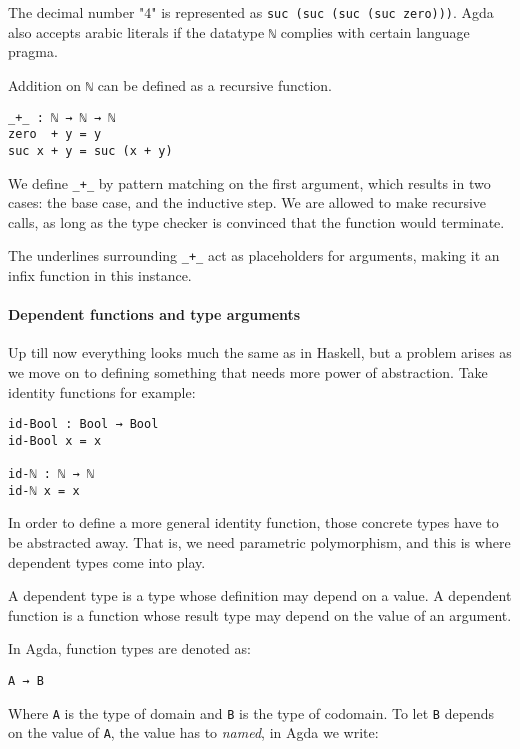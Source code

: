 \documentclass[../thesis.tex]{subfiles}
\begin{document}
The decimal number "4" is represented as {\lstinline|suc (suc (suc (suc zero)))|}.
Agda also accepts arabic literals if the datatype {\lstinline|ℕ|} complies with
certain language pragma.

Addition on {\lstinline|ℕ|} can be defined as a recursive function.

\begin{lstlisting}
_+_ : ℕ → ℕ → ℕ
zero  + y = y
suc x + y = suc (x + y)
\end{lstlisting}

We define {\lstinline|_+_|} by pattern matching on the first argument, which results
in two cases: the base case, and the inductive step. We are allowed to make
recursive calls, as long as the type checker is convinced that the function
would terminate.

The underlines surrounding {\lstinline|_+_|} act as placeholders for arguments, making
it an infix function in this instance.

\paragraph{Dependent functions and type arguments}
Up till now everything looks much the same as in Haskell, but a problem arises as
we move on to defining something that needs more power of abstraction. Take identity
functions for example:

\begin{lstlisting}
id-Bool : Bool → Bool
id-Bool x = x

id-ℕ : ℕ → ℕ
id-ℕ x = x
\end{lstlisting}

In order to define a more general identity function, those concrete types have
to be abstracted away. That is, we need parametric polymorphism, and this is
where dependent types come into play.

A dependent type is a type whose definition may depend on a value. A dependent
function is a function whose result type may depend on the value of an argument.

In Agda, function types are denoted as:

\begin{lstlisting}
A → B
\end{lstlisting}

Where {\lstinline|A|} is the type of domain and {\lstinline|B|} is the type of
codomain. To let {\lstinline|B|} depends on the value of {\lstinline|A|}, the
value has to \textit{named}, in Agda we write:
\end{document}
